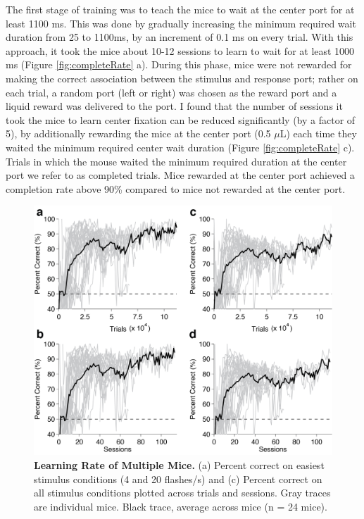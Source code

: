 The first stage of training was to teach the mice to wait at the center port for at least 1100 ms. This was done by gradually increasing the minimum required wait duration from 25 to 1100ms, by an increment of 0.1 ms on every trial. With this approach, it took the mice about 10-12 sessions to learn to wait for at least 1000 ms (Figure \ref{fig:completeRate} a). During this phase, mice were not rewarded for making the correct association between the stimulus and response port; rather on each trial, a random port (left or right) was chosen as the reward port and a liquid reward was delivered to the port. I found that the number of sessions it took the mice to learn center fixation can be reduced significantly (by a factor of 5), by additionally rewarding the mice at the center port (0.5 $\mu$L) each time they waited the minimum required center wait duration (Figure \ref{fig:completeRate} c). Trials in which the mouse waited the minimum required duration at the center port we refer to as completed trials. Mice rewarded at the center port achieved a completion rate above 90\% compared to mice not rewarded at the center port.\par
\begin{figure}
  \centering
  	\includegraphics[width=\textwidth]{Figures/chapter2/percentCorrectAllMice.png}
  \caption[Learning Rate]{\textbf{Learning Rate of Multiple Mice.} (a) Percent correct on easiest stimulus conditions (4 and 20 flashes/s) and (c) Percent correct on all stimulus conditions plotted across trials and sessions. Gray traces are individual mice. Black trace, average across mice (n = 24 mice).}
   \label{fig:pcorrect}
\end{figure}
